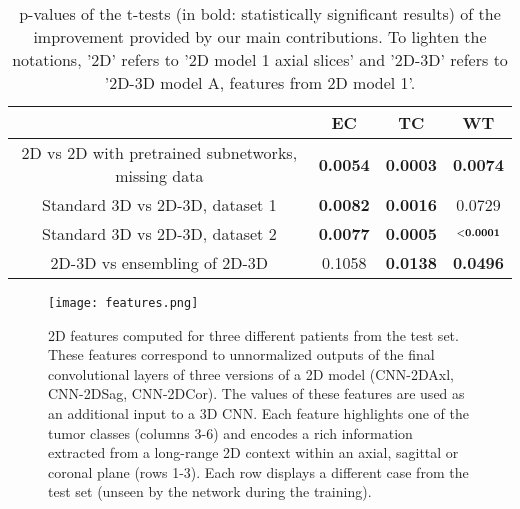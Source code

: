 \documentclass[preprint,12pt]{elsarticle}
\begin{document}
\begin{table}[ht!]
\centering
\caption{p-values of the t-tests (in bold: statistically significant results) of the improvement provided by our main contributions. To lighten the notations, '2D' refers to '2D model 1 axial slices' and '2D-3D' refers to '2D-3D model A, features from 2D model 1'.}
\begin{tabular}{|c|c|c|c|}
\hline

  \hline


&   \scriptsize{EC} &  \scriptsize{TC} &  \scriptsize{WT}    \\ 
  \hline


\scriptsize{2D vs 2D with pretrained subnetworks, missing data}   &  \scriptsize{\textbf{0.0054}} &  \scriptsize{\textbf{0.0003}}&  \scriptsize{\textbf{0.0074}}  \\ 




  \hline


  \scriptsize{Standard 3D vs 2D-3D, dataset 1}  &  \scriptsize{\textbf{0.0082}}&  \scriptsize{\textbf{0.0016}}&  \scriptsize{0.0729}  \\ 
  

\hline



\scriptsize{Standard 3D vs 2D-3D, dataset 2} &  \scriptsize{\textbf{0.0077}}&  \scriptsize{\textbf{0.0005}}&  $\scriptsize{\textbf{$<$0.0001}}$  

\\


  \hline

\scriptsize{2D-3D vs ensembling of 2D-3D}   &  \scriptsize{0.1058}&  \scriptsize{\textbf{0.0138}}&  \scriptsize{\textbf{0.0496}}  \\ 
  \hline

\end{tabular}
\label{table_pvalues}
\end{table}




\begin{figure}[ht!]
\centering
\texttt{[image: features.png]}
\caption{2D features computed for three different patients from the test set. These features correspond to unnormalized outputs of the final convolutional layers of three versions of a 2D model (CNN-2DAxl, CNN-2DSag, CNN-2DCor). The values of these features are used as an additional input to a 3D CNN. Each feature highlights one of the tumor classes (columns 3-6) and encodes a rich information extracted from a long-range 2D context within an axial, sagittal or coronal plane (rows 1-3). Each row displays a different case from the test set (unseen by the network during the training).}
\label{fig_features}
\end{figure}
\end{document}
